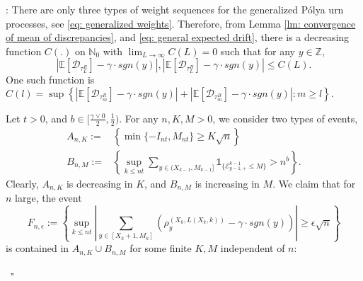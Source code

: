\documentclass[twoside,12pt,a4paper]{article}
\numberwithin{equation}{section}
\newenvironment{proof}[1][Proof]{{\sc #1}:}{~\hfill $\square$}
\newcommand{\abs}[1]{\left\vert #1 \right\vert}
\begin{document}
\begin{proof} There are only three types of weight sequences for the generalized P\'{o}lya urn processes, see \eqref{eq: generalized weights}. Therefore, from Lemma \ref{lm: convergence of mean of discrepancies}, and 
	\eqref{eq: general expected drift}, there is a decreasing function $C(.)$ on $\mathbb{N}_0$ with $\lim_{L\to \infty}C(L) =0$ such that for any $y \in \mathbb{Z}$,
	\begin{equation}\label{eq: uniform convergence}
		\abs{\mathbb{E}\left[ \mathcal{D}_{\tau_L^R} \right] - \gamma \cdot sgn(y)}, \abs{\mathbb{E}\left[ \mathcal{D}_{\tau_L^B} \right] - \gamma \cdot sgn(y)} \leq C(L).
	\end{equation} One such function is $C(l) = \sup \left\{  \abs{\mathbb{E}\left[ \mathcal{D}_{\tau_m^R} \right] - \gamma \cdot sgn(y)} + \abs{\mathbb{E}\left[ \mathcal{D}_{\tau_m^B} \right] - \gamma \cdot sgn(y)} : m\geq l \right\}.     $  
	
	
	Let $t>0$, and $b \in [\frac{\gamma \vee 0 }{2},\frac{1}{2})$.  For any $n,K,M>0$, we consider two types of events, 
	\begin{align*}
	A_{n,K}:=&\left\{ \min\{-I_{nt}, M_{nt}\} \geq K \sqrt{n}  \right\}
	\\
	B_{n,M}:=& \left\{  \sup_{k\leq n t} \sum_{ y\in (X_{k-1}, M_{k-1}]}  \mathbb{1}_{\{ \mathcal{E}^{k-1}_{y-1,+} \leq M  \}} >n^b  \right\}.
	\end{align*}
Clearly, $A_{n,K}$ is decreasing in $K$, and $B_{n,M}$ is increasing in $M$. We claim that for $n$ large, the event 
$$
F_{n,\epsilon}:= \left\{ \sup_{k\leq n t}  \abs{  	\sum_{y\in [X_{k}+1 ,M_k]} \left( \rho^{(X_k,L(X_k,k))}_y -  \gamma \cdot sgn(y) \right) } \geq  \epsilon \sqrt{n}    \right \}$$ is contained in $A_{n,K} \cup B_{n,M} $ for some finite $K, M$ independent of $n$:   


\end{proof}
\end{document}
